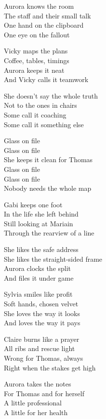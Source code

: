 \begin{lyrics}
Aurora knows the room\\
The staff and their small talk\\
One hand on the clipboard\\
One eye on the fallout

Vicky maps the plans\\
Coffee, tables, timings\\
Aurora keeps it neat\\
And Vicky calls it teamwork

She doesn’t say the whole truth\\
Not to the ones in chairs\\
Some call it coaching\\
Some call it something else

Glass on file\\
Glass on file\\
She keeps it clean for Thomas\\
Glass on file\\
Glass on file\\
Nobody needs the whole map

Gabi keeps one foot\\
In the life she left behind\\
Still looking at Mariain\\
Through the rearview of a line

She likes the safe address\\
She likes the straight-sided frame\\
Aurora clocks the split\\
And files it under game

Sylvia smiles like profit\\
Soft hands, chosen velvet\\
She loves the way it looks\\
And loves the way it pays

Claire burns like a prayer\\
All ribs and rescue light\\
Wrong for Thomas, always\\
Right when the stakes get high

Aurora takes the notes\\
For Thomas and for herself\\
A little professional\\
A little for her health


\end{lyrics}
